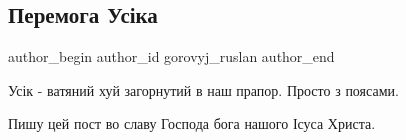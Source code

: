  
 
 
 
 
 
\subsection{Перемога Усіка}
\label{sec:26_09_2021.fb.gorovyj_ruslan.1.usik_vatnyj_hxx_hristos}
 
\ifcmt
 author_begin
   author_id gorovyj_ruslan
 author_end
\fi

Усік - ватяний хуй загорнутий в наш прапор. Просто з поясами. 

Пишу цей пост во славу Господа бога нашого Ісуса Христа.

